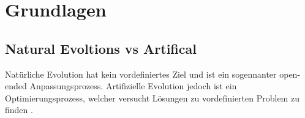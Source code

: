 %
%


\chapter{Grundlagen}
\lipsum[6] \cite{IEEEexample:article_typical}
\lipsum[7] \cite{mirrorcle_userguide}
\section{Natural Evoltions vs Artifical}
  Natürliche Evolution hat kein vordefiniertes Ziel und ist ein sogennanter open-ended Anpassungsprozess. Artifizielle Evolution jedoch ist ein Optimierungsprozess, welcher versucht Lösungen zu vordefinierten Problem zu finden \cite[S.1]{book:bioInspired}. \\

